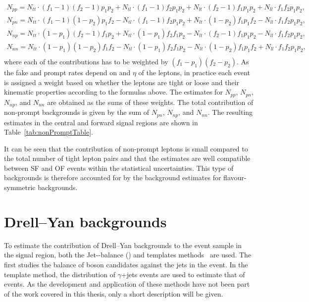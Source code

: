 \begin{eqnarray*}
N_{pp} = N_{tt}\cdot(f_1 -1)(f_2-1)p_1p_2 + N_{tl}\cdot(f_1 -1)f_2p_1p_2 + N_{lt}\cdot (f_2-1)f_1p_1p_2 + N_{ll}\cdot f_1f_2p_1p_2,\\
N_{pn} = N_{tt}\cdot(f_1 -1)(1-p_2)p_1f_2 - N_{tl}\cdot(f_1 -1)f_2p_1p_2 + N_{lt}\cdot (1-p_2)f_1p_1f_2 - N_{ll}\cdot f_1f_2p_1p_2,\\
N_{np} = N_{tt}\cdot(1 - p_1)(f_2 - 1)f_1p_2 + N_{tl}\cdot(1-p_1)f_2f_1p_2 - N_{lt}\cdot (f_2-1)f_1p_1p_2 - N_{ll}\cdot f_1f_2p_1p_2,\\
N_{nn} = N_{tt}\cdot(1-p_1)(1-p_2)f_1f_2 - N_{tl}\cdot (1-p_1)f_2f_1p_2 - N_{lt}\cdot (1-p_2)f_1p_1f_2 + N_{ll}\cdot f_1f_2p_1p_2,\\
\end{eqnarray*}
where each of the contributions has to be weighted by $(f_1-p_1)(f_2-p_2)$. As the fake and prompt rates depend on \pt and $\eta$ of the leptons, in practice each event is assigned a weight based on whether the leptons are tight or loose and their kinematic properties according to the formulas above. The estimates for $N_{pp}$, $N_{pn}$, $N_{np}$, and $N_{nn}$ are obtained as the sums of these weights. The total contribution of non-prompt backgrounds is given by the sum of $N_{pn}$, $N_{np}$, and $N_{nn}$. The resulting estimates in the central and forward signal regions are shown in Table~\ref{tab:nonPromptTable}. 

It can be seen that the contribution of non-prompt leptons is small compared to the total number of tight lepton pairs and that the estimates are well compatible between SF and OF events within the statistical uncertainties. This type of backgrounds is therefore accounted for by the background estimates for flavour-symmetric backgrounds.

\section{Drell--Yan backgrounds}
To estimate the contribution of Drell--Yan backgrounds to the event sample in the signal region, both the Jet-\Z-balance (\JZB) and \MET templates methods~\cite{Chatrchyan:2012qka} are used. The first studies the balance of \Z boson candidates against the jets in the event. In the \MET template method, the \MET distribution of $\gamma$+jets events are used to estimate that of \zjets events. As the development and application of these methods have not been part of the work covered in this thesis, only a short description will be given.

